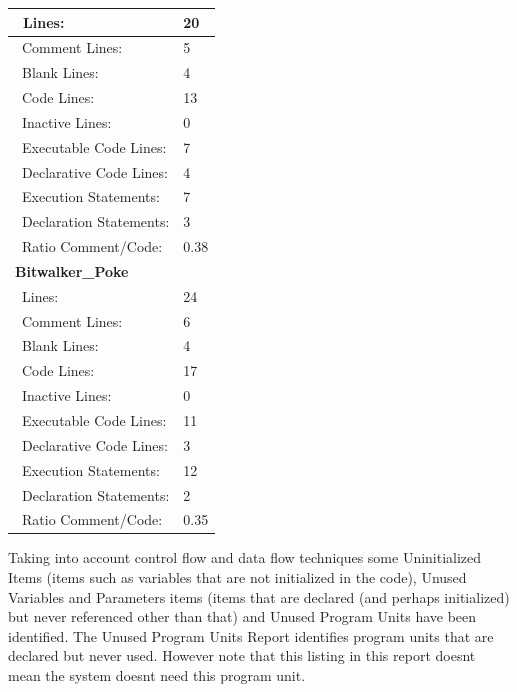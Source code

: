 \begin{longtable}{||p{}|p{}||}
\\\hline
    \ Lines: & 20
    \\
    \hline
    \ Comment Lines: & 5
    \\
    \hline
    \ Blank Lines: & 4
    \\
    \hline
    \ Code Lines:  & 13
    \\
    \hline
    \ Inactive Lines:  & 0
    \\
    \hline
    \ Executable Code Lines:  & 7
    \\
    \hline
    \ Declarative Code Lines:  & 4
    \\
    \hline
    \ Execution Statements:  & 7
    \\
    \hline
    \ Declaration Statements:  & 3
    \\
    \hline
    \ Ratio Comment/Code:  & 0.38
    \\
    \hline
        \multicolumn{2}{||l||}{\textbf{Bitwalker\_Poke}}
\\\hline
    \ Lines: & 24
    \\
    \hline
    \ Comment Lines: & 6
    \\
    \hline
    \ Blank Lines: & 4
    \\
    \hline
    \ Code Lines:  & 17
    \\
    \hline
    \ Inactive Lines:  & 0
    \\
    \hline
    \ Executable Code Lines:  & 11
    \\
    \hline
    \ Declarative Code Lines:  & 3
    \\
    \hline
    \ Execution Statements:  & 12
    \\
    \hline
    \ Declaration Statements:  & 2
    \\
    \hline
    \ Ratio Comment/Code:  & 0.35
    \\
    \hline
   \end{longtable}

Taking into account control flow and data flow techniques some Uninitialized Items (items such as variables that are not initialized in the code), Unused Variables and Parameters items (items that are declared (and perhaps initialized) but never referenced other than that) and Unused Program Units have been identified. The Unused Program Units Report identifies program units that are declared but never used. However note that this listing in this report doesnt mean the system doesnt need this program unit.

